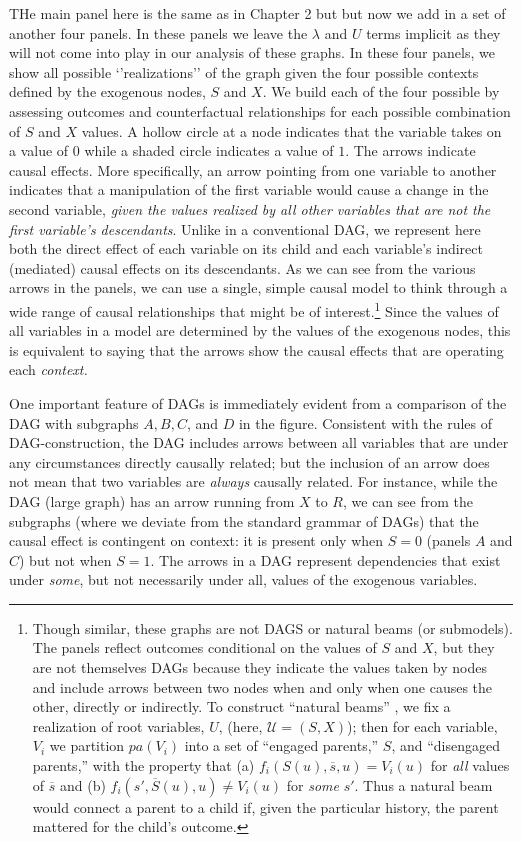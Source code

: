 \documentclass[12pt,]{book}
\let\rmarkdownfootnote\footnote%
\def\footnote{\protect\rmarkdownfootnote}
\begin{document}
THe main panel here is the same as in Chapter 2 but but now we add in a set of another four panels. In these panels we leave the \(\lambda\) and \(U\) terms implicit as they will not come into play in our analysis of these graphs. In these four panels, we show all possible `'realizations'' of the graph given the four possible contexts defined by the exogenous nodes, \(S\) and \(X\). We build each of the four possible by assessing outcomes and counterfactual relationships for each possible combination of \(S\) and \(X\) values. A hollow circle at a node indicates that the variable takes on a value of \(0\) while a shaded circle indicates a value of \(1\). The arrows indicate causal effects. More specifically, an arrow pointing from one variable to another indicates that a manipulation of the first variable would cause a change in the second variable, \emph{given the values realized by all other variables that are not the first variable's descendants}. Unlike in a conventional DAG, we represent here both the direct effect of each variable on its child and each variable's indirect (mediated) causal effects on its descendants. As we can see from the various arrows in the panels, we can use a single, simple causal model to think through a wide range of causal relationships that might be of interest.\footnote{Though similar, these graphs are not DAGS or natural beams (or submodels). The panels reflect outcomes conditional on the values of \(S\) and \(X\), but they are not themselves DAGs because they indicate the values taken by nodes and include arrows between two nodes when and only when one causes the other, directly or indirectly. To construct ``natural beams'' \citep[ 10.3]{pearl2009causality}, we fix a realization of root variables, \(U\), (here, \(\mathcal U = (S, X)\)); then for each variable, \(V_i\) we partition \(pa(V_i)\) into a set of ``engaged parents,'' \(S\), and ``disengaged parents,'' with the property that (a) \(f_i(S(u), \overline{s}, u) = V_i(u)\) for \emph{all} values of \(\overline{s}\) and (b) \(f_i(s', \overline{S}(u), u) \neq V_i(u)\) for \emph{some} \(s'\). Thus a natural beam would connect a parent to a child if, given the particular history, the parent mattered for the child's outcome.} Since the values of all variables in a model are determined by the values of the exogenous nodes, this is equivalent to saying that the arrows show the causal effects that are operating each \emph{context.}

One important feature of DAGs is immediately evident from a comparison of the DAG with subgraphs \(A, B, C\), and \(D\) in the figure. Consistent with the rules of DAG-construction, the DAG includes arrows between all variables that are under any circumstances directly causally related; but the inclusion of an arrow does not mean that two variables are \emph{always} causally related. For instance, while the DAG (large graph) has an arrow running from \(X\) to \(R\), we can see from the subgraphs (where we deviate from the standard grammar of DAGs) that the causal effect is contingent on context: it is present only when \(S=0\) (panels \(A\) and \(C\)) but not when \(S=1\). The arrows in a DAG represent dependencies that exist under \emph{some}, but not necessarily under all, values of the exogenous variables.
\end{document}

